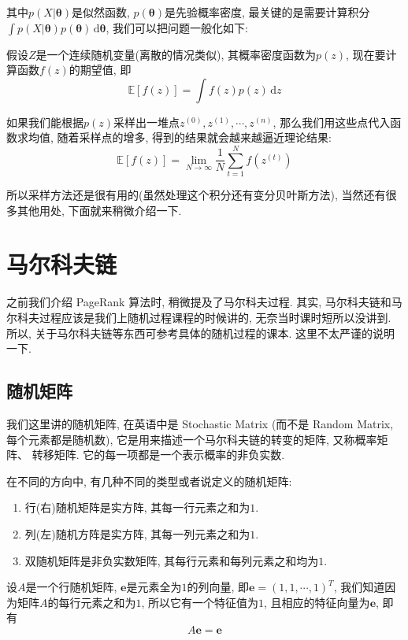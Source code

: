 \documentclass[a4paper,UTF8]{ctexart}
\theoremstyle{plain} \newtheorem{theorem}{定理}[section]
\theoremstyle{plain} \newtheorem{definition}{定义}[section]
\theoremstyle{plain} \newtheorem{lemma}{引理}[section]
\theoremstyle{plain} \newtheorem{proposition}{命题}[section]
\theoremstyle{plain} \newtheorem{example}{例}[section]
\theoremstyle{plain} \newtheorem{remark}{注}[section]
\theoremstyle{plain} \newtheorem{corollary}{推论}[section]
\newcommand\diff{\,{\mathrm d}} %
\begin{document}
其中$p(X | \bm{\theta})$是似然函数, $p(\bm{\theta})$是先验概率密度, 最关键的是需要计算积分$\displaystyle \int p(X | \bm{\theta}) p(\bm{\theta}) \diff \bm{\theta}$, 我们可以把问题一般化如下:

假设$Z$是一个连续随机变量(离散的情况类似), 其概率密度函数为$p(z)$, 现在要计算函数$f(z)$的期望值, 即
\begin{equation*}
\mathbb{E}[f(z)] = \int f(z) p(z) \diff z
\end{equation*}

如果我们能根据$p(z)$采样出一堆点$z^{(0)}, z^{(1)}, \cdots, z^{(n)}$, 那么我们用这些点代入函数求均值, 随着采样点的增多, 得到的结果就会越来越逼近理论结果:
\begin{equation*}
\mathbb{E}[f(z)] = \lim_{N \rightarrow \infty} \frac{1}{N} \sum_{t=1}^{N} f(z^{(t)})
\end{equation*}

所以采样方法还是很有用的(虽然处理这个积分还有变分贝叶斯方法), 当然还有很多其他用处, 下面就来稍微介绍一下.


\section{马尔科夫链}
之前我们介绍 PageRank 算法时, 稍微提及了马尔科夫过程. 其实, 马尔科夫链和马尔科夫过程应该是我们上随机过程课程的时候讲的, 无奈当时课时短所以没讲到. 所以, 关于马尔科夫链等东西可参考具体的随机过程的课本. 这里不太严谨的说明一下.

\subsection{随机矩阵}
我们这里讲的随机矩阵, 在英语中是 Stochastic Matrix (而不是 Random Matrix, 每个元素都是随机数), 它是用来描述一个马尔科夫链的转变的矩阵, 又称概率矩阵、 转移矩阵. 它的每一项都是一个表示概率的非负实数.

在不同的方向中, 有几种不同的类型或者说定义的随机矩阵:
\begin{enumerate}[(1)]
\item 行(右)随机矩阵是实方阵, 其每一行元素之和为$1$.

\item 列(左)随机方阵是实方阵, 其每一列元素之和为$1$.

\item 双随机矩阵是非负实数矩阵, 其每行元素和每列元素之和均为$1$.
\end{enumerate}

设$A$是一个行随机矩阵, $\bm{e}$是元素全为$1$的列向量, 即$\bm{e} = (1, 1, \cdots, 1)^{T}$, 我们知道因为矩阵$A$的每行元素之和为$1$, 所以它有一个特征值为$1$, 且相应的特征向量为$\bm{e}$, 即有
\begin{equation*}
A \bm{e} = \bm{e}
\end{equation*}
\end{document}
